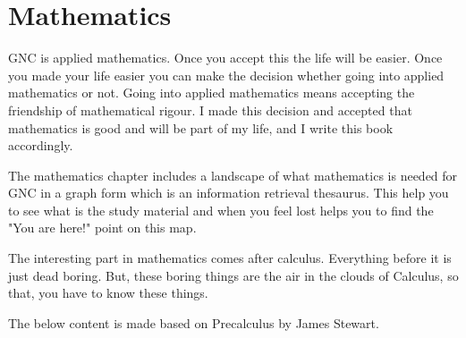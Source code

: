 \part{Mathematics}

GNC is applied mathematics. Once you accept this the life will be easier. Once
you made your life easier you can make the decision whether going into applied
mathematics or not. Going into applied mathematics means accepting the
friendship of mathematical rigour. I made this decision and accepted that
mathematics is good and will be part of my life, and I write this book
accordingly.

The mathematics chapter includes a landscape of what mathematics is needed for
GNC in a graph form which is an information retrieval thesaurus. This help you
to see what is the study material and when you feel lost helps you to find the
"You are here!" point on this map.

The interesting part in mathematics comes after calculus. Everything before it
is just dead boring. But, these boring things are the air in the clouds of
Calculus, so that, you have to know these things.



The below content is made based on Precalculus by James Stewart.



